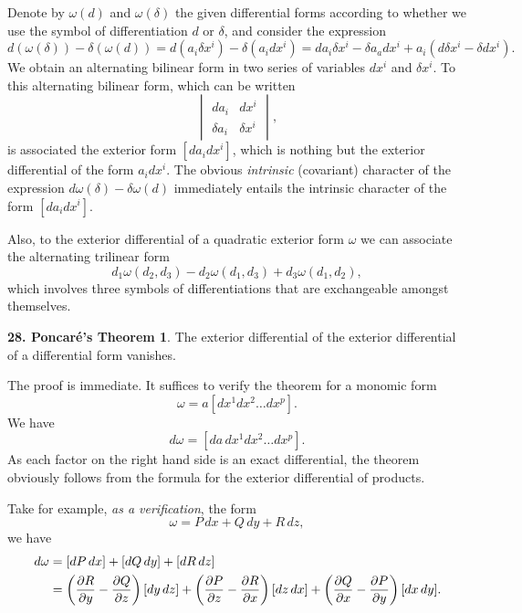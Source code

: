 \documentclass[leqno,11pt]{book}
\numberwithin{equation}{chapter}
\newcommand{\pd}{\partial}
\theoremstyle{shape1}
\theoremstyle{shape0}
\theoremstyle{shape2}
\theoremstyle{definition}
\begin{document}
Denote by $\omega(d)$ and $\omega(\delta)$ the given differential forms according to whether we use the symbol of differentiation $d$ or $\delta$, and consider the expression
\[
d(\omega(\delta))-\delta(\omega(d))=d(a_{i}\delta x^{i})-\delta(a_{i}dx^{i})=da_{i}\delta x^{i}-\delta a_{a}dx^{i}+a_{i}(d\delta x^{i}-\delta dx^{i}).
\]
We obtain an alternating bilinear form in two series of variables $dx^{i}$ and $\delta x^{i}$. To this alternating bilinear form, which can be written
\[
\begin{vmatrix}
  da_{i}&dx^{i}\\
  \delta a_{i}&\delta x^{i}
\end{vmatrix},
\]
is associated the exterior form $[da_{i}dx^{i}]$, which is nothing but the exterior differential of the form $a_{i}dx^{i}$. The obvious \emph{intrinsic} (covariant) character of the expression $d\omega(\delta)-\delta\omega(d)$ immediately entails the intrinsic character of the form $[da_{i}dx^{i}]$.

Also, to the exterior differential of a quadratic exterior form $\omega$ we can associate  the alternating trilinear form
\[
d_{1}\omega(d_{2},d_{3})-d_{2}\omega(d_{1},d_{3})+d_{3}\omega(d_{1},d_{2}),
\]
which involves three symbols of differentiations that are exchangeable amongst themselves.
\vspace{12pt}\addtocounter{frenchsec}{1}
\theoremstyle{shape1}
\newtheorem*{thm28}{\hspace{15pt}\textbf{28.} Poncar\'e's Theorem}

\begin{thm28}
  The exterior differential of the exterior differential of a differential form vanishes.
\end{thm28}

The proof is immediate. It suffices to verify the theorem for a monomic form
\[
\omega=a[dx^{1}dx^{2}\dots dx^{p}].
\]
We have
\[
d\omega=[da\,dx^{1}dx^{2}\dots dx^{p}].
\]
As each factor on the right hand side is an exact differential, the theorem obviously follows from the formula for the exterior differential of products.

Take for example, \emph{as a verification}, the form
\begin{equation}
  \label{eq:2.5}
  \omega=P\,dx+Q\,dy+R\,dz,
\end{equation}
we have
\begin{align}
  \label{eq:2.6}
  d\omega&=[dP\,dx]+[dQ\,dy]+[dR\,dz]\\
  &=\left(\frac{\pd R}{\pd y}-\frac{\pd Q}{\pd z}\right)[dy\,dz]+\left(\frac{\pd P}{\pd z}-\frac{\pd R}{\pd x}\right)[dz\,dx]+\left(\frac{\pd Q}{\pd x}-\frac{\pd P}{\pd y}\right)[dx\,dy].\notag
\end{align}
\end{document}
